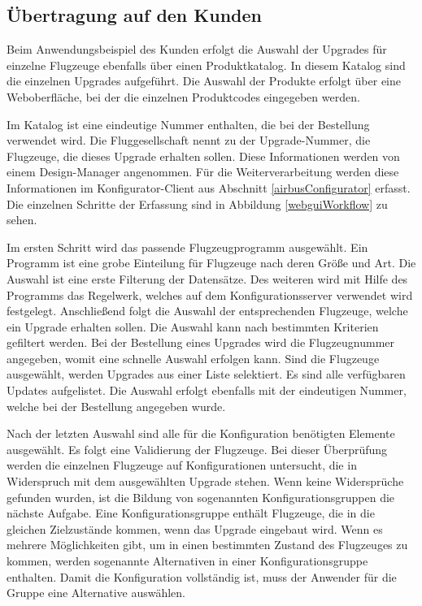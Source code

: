 \subsection{Übertragung auf den Kunden}
Beim Anwendungsbeispiel des Kunden erfolgt die Auswahl der Upgrades für einzelne Flugzeuge ebenfalls über einen Produktkatalog. In diesem Katalog sind die einzelnen Upgrades aufgeführt. Die Auswahl der Produkte erfolgt über eine Weboberfläche, bei der die einzelnen Produktcodes eingegeben werden. 

Im Katalog ist eine eindeutige Nummer enthalten, die bei der Bestellung verwendet wird. Die Fluggesellschaft nennt zu der Upgrade-Nummer, die Flugzeuge, die dieses Upgrade erhalten sollen. Diese Informationen werden von einem Design-Manager angenommen. Für die Weiterverarbeitung werden diese Informationen im Konfigurator-Client aus Abschnitt \ref{airbusConfigurator} erfasst. Die einzelnen Schritte der Erfassung sind in Abbildung \ref{webguiWorkflow} zu sehen. \par


Im ersten Schritt wird das passende Flugzeugprogramm ausgewählt. Ein Programm ist eine grobe Einteilung für Flugzeuge nach deren Größe und Art. Die Auswahl ist eine erste Filterung der Datensätze. Des weiteren wird mit Hilfe des Programms das Regelwerk, welches auf dem Konfigurationsserver verwendet wird festgelegt. Anschließend folgt die Auswahl der entsprechenden Flugzeuge, welche ein Upgrade erhalten sollen. Die Auswahl kann nach bestimmten Kriterien gefiltert werden. Bei der Bestellung eines Upgrades wird die Flugzeugnummer angegeben, womit eine schnelle Auswahl erfolgen kann. Sind die Flugzeuge ausgewählt, werden Upgrades aus einer Liste selektiert. Es sind alle verfügbaren Updates aufgelistet. Die Auswahl erfolgt ebenfalls mit der eindeutigen Nummer, welche bei der Bestellung angegeben wurde. \par 

Nach der letzten Auswahl sind alle für die Konfiguration benötigten Elemente ausgewählt. Es folgt eine Validierung der Flugzeuge. Bei dieser Überprüfung werden die einzelnen Flugzeuge auf Konfigurationen untersucht, die in Widerspruch mit dem ausgewählten Upgrade stehen. Wenn keine Widersprüche gefunden wurden, ist die Bildung von sogenannten Konfigurationsgruppen die nächste Aufgabe. Eine Konfigurationsgruppe enthält Flugzeuge, die in die gleichen Zielzustände kommen, wenn das Upgrade eingebaut wird. Wenn es mehrere Möglichkeiten gibt, um in einen bestimmten Zustand des Flugzeuges zu kommen, werden sogenannte Alternativen in einer Konfigurationsgruppe enthalten. Damit die Konfiguration vollständig ist, muss der Anwender für die Gruppe eine Alternative auswählen. \par

